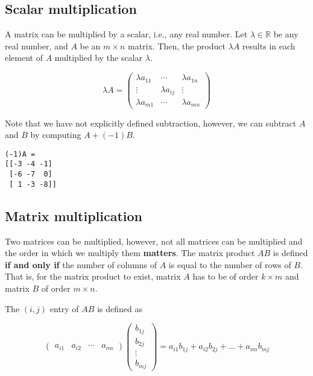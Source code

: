 \documentclass[11pt]{article}
\begin{document}
    \hypertarget{scalar-multiplication}{%
\subsection{Scalar multiplication}\label{scalar-multiplication}}

A matrix can be multiplied by a scalar, i.e., any real number. Let
\(\lambda\in\mathbb{R}\) be any real number, and \(A\) be an
\(m\times n\) matrix. Then, the product \(\lambda A\) results in each
element of \(A\) multiplied by the scalar \(\lambda\).

\[
\lambda A = \begin{pmatrix} \lambda a_{11} & \cdots & \lambda a_{1n} \\ \vdots & \lambda a_{ij} & \vdots \\ \lambda a_{m1} & \cdots & \lambda a_{mn} \end{pmatrix}
\]

Note that we have not explicitly defined subtraction, however, we can
subtract \(A\) and \(B\) by computing \(A + (-1) B\).

    \begin{Verbatim}[commandchars=\\\{\}]
(-1)A =
[[-3 -4 -1]
 [-6 -7  0]
 [ 1 -3 -8]]
\end{Verbatim}

    \hypertarget{matrix-multiplication}{%
\subsection{Matrix multiplication}\label{matrix-multiplication}}

Two matrices can be multiplied, however, not all matrices can be
multiplied and the order in which we multiply them \textbf{matters}. The
matrix product \(AB\) is defined \textbf{if and only if} the number of
columns of \(A\) is equal to the number of rows of \(B\). That is, for
the matrix product to exist, matrix \(A\) has to be of order
\(k\times m\) and matrix \(B\) of order \(m\times n\).

The \((i,j)\) entry of \(AB\) is defined as

\[
\begin{pmatrix} a_{i1} & a_{i2} & \cdots & a_{im}\end{pmatrix} \begin{pmatrix} b_{1j} \\ b_{2j} \\ \vdots \\ b_{mj}\end{pmatrix} = a_{i1}b_{1j} + a_{i2}b_{2j} + \ldots + a_{im}b_{mj}
\]
\end{document}
